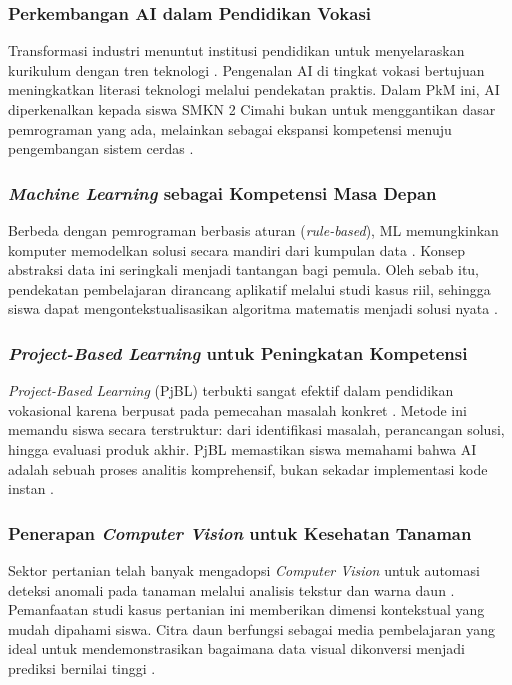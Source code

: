 \subsubsection{Perkembangan AI dalam Pendidikan Vokasi}
Transformasi industri menuntut institusi pendidikan untuk menyelaraskan kurikulum dengan tren teknologi \parencite{Utomo2024}. Pengenalan AI di tingkat vokasi bertujuan meningkatkan literasi teknologi melalui pendekatan praktis. Dalam PkM ini, AI diperkenalkan kepada siswa SMKN 2 Cimahi bukan untuk menggantikan dasar pemrograman yang ada, melainkan sebagai ekspansi kompetensi menuju pengembangan sistem cerdas \parencite{TofanDwiTjahyono2025}.

\subsubsection{\textit{Machine Learning} sebagai Kompetensi Masa Depan}
Berbeda dengan pemrograman berbasis aturan (\textit{rule-based}), ML memungkinkan komputer memodelkan solusi secara mandiri dari kumpulan data \parencite{Panjaitan2025}. Konsep abstraksi data ini seringkali menjadi tantangan bagi pemula. Oleh sebab itu, pendekatan pembelajaran dirancang aplikatif melalui studi kasus riil, sehingga siswa dapat mengontekstualisasikan algoritma matematis menjadi solusi nyata \parencite{Wibowo2026}.

\subsubsection{\textit{Project-Based Learning} untuk Peningkatan Kompetensi}
\textit{Project-Based Learning} (PjBL) terbukti sangat efektif dalam pendidikan vokasional karena berpusat pada pemecahan masalah konkret \parencite{Wahyudi2024}. Metode ini memandu siswa secara terstruktur: dari identifikasi masalah, perancangan solusi, hingga evaluasi produk akhir. PjBL memastikan siswa memahami bahwa AI adalah sebuah proses analitis komprehensif, bukan sekadar implementasi kode instan \parencite{PANE2025}.

\subsubsection{Penerapan \textit{Computer Vision} untuk Kesehatan Tanaman}
Sektor pertanian telah banyak mengadopsi \textit{Computer Vision} untuk automasi deteksi anomali pada tanaman melalui analisis tekstur dan warna daun \parencite{Imanulloh2023}. Pemanfaatan studi kasus pertanian ini memberikan dimensi kontekstual yang mudah dipahami siswa. Citra daun berfungsi sebagai media pembelajaran yang ideal untuk mendemonstrasikan bagaimana data visual dikonversi menjadi prediksi bernilai tinggi \parencite{MarwanRamdhanyEdy2025}.

